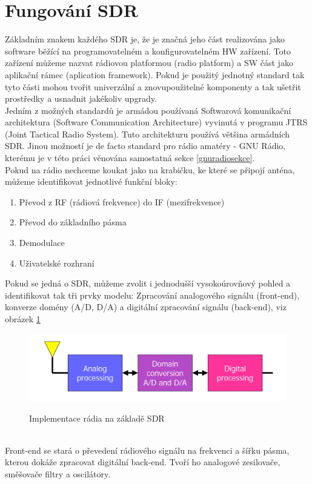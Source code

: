 \documentclass{ctuthesis}
\begin{document}
\section{Fungování SDR}
Základním znakem každého SDR je, že je značná jeho část realizována jako software běžící na programovatelném a konfigurovatelném HW zařízení. Toto zařízení můžeme nazvat rádiovou platformou (radio platform) a SW část jako aplikační rámec (aplication framework). Pokud je použitý jednotný standard tak tyto části mohou tvořit univerzální a znovupoužitelné komponenty a tak ušetřit prostředky a usnadnit jakékoliv upgrady.\\
Jedním z možných standardů je armádou používaná Softwarová komunikační architektura (Software Communication Architecture) vyvinutá  v programu JTRS (Joint Tactical Radio System). Tuto architekturu používá většina armádních SDR. \cite{sdr2006}
Jinou možností je de facto standard pro rádio amatéry - GNU Rádio, kterému je v této práci věnována samostatná sekce \ref{gnuradiosekce}.\\
Pokud na rádio nechceme koukat jako na krabičku, ke které se připojí anténa, můžeme identifikovat jednotlivé funkční bloky:
\begin{enumerate}
\item
Převod z RF (rádiová frekvence) do IF (mezifrekvence)
\item
Převod do základního pásma
\item
Demodulace
\item
Uživatelské rozhraní
\end{enumerate}
Pokud se jedná o SDR, můžeme zvolit i jednodušší vysokoúrovňový pohled a identifikovat tak tři prvky modelu: Zpracování analogového signálu (front-end), konverze domény (A/D, D/A) a digitální zpracování signálu (back-end), viz obrázek \ref{blokySDR}
\begin{figure}
\caption{Implementace rádia na základě SDR\cite{sdr2006}}
\includegraphics[width=1\textwidth]{./images/funkcniSDRbloky.png}
\label{blokySDR}
\end{figure}
\\
Front-end se stará o převedení rádiového signálu na frekvenci a šířku pásma, kterou dokáže zpracovat digitální back-end. Tvoří ho analogové zesilovače, směšovače filtry a oscilátory.\\
\end{document}
